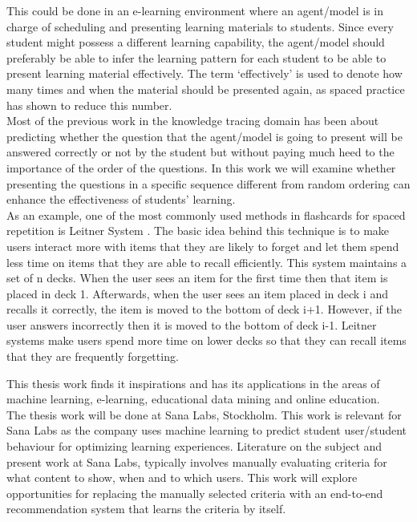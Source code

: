 \documentclass[12pt]{article}
\begin{document}
This could be done in an e-learning environment where an agent/model is in charge of scheduling and presenting learning materials to students. Since every student might possess a different learning capability, the agent/model should preferably be able to infer the learning pattern for each student to be able to present learning material effectively. The term ‘effectively’ is used to denote how many times and when the material should be presented again, as spaced practice has shown to reduce this number.\\

Most of the previous work in the knowledge tracing domain has been about predicting whether the question that the agent/model is going to present will be answered correctly or not by the student \cite{dkt} but {\color{blue}without} paying much heed to the importance of the order of the questions. {\color{blue} In this work we will examine whether presenting the questions in a specific sequence different from random ordering can enhance the effectiveness of students' learning.}\\

As an example, one of the most {\color{blue}commonly} used method{\color{blue}s} in flashcards for spaced repetition is Leitner System \cite{leitner}. The basic idea behind this technique is to make users interact more with items that they are likely to forget and let them spend less time on items that they are able to recall efficiently. This system maintains a set of {\color{blue}n }decks. When the user sees an item for the first time then that item is placed in deck 1. Afterwards, when the user sees an item placed in deck i and recalls it correctly, the item is moved to the bottom of deck  i+1. However, if the user answers incorrectly then it is moved to the bottom of deck i-1. {\color{blue}Leitner systems make users spend more time on lower decks so that they can recall items that they are frequently forgetting}. 

This thesis work finds it inspirations {\color{blue}and} has its applications in the areas of machine learning, e-learning, educational data mining and online education.\\

The thesis work will be done at Sana Labs, Stockholm. This work is relevant for Sana Labs as {\color{blue}the company uses} machine learning to predict student user/student behaviour for optimizing learning experiences. Literature on the subject and present work at Sana Labs, typically involves manually evaluating criteria for what content to show, when and to which users. This {\color{blue}work will explore opportunities for} replacing the manually selected criteria with an end-to-end recommendation system that learns the criteria by itself.\\
\end{document}
